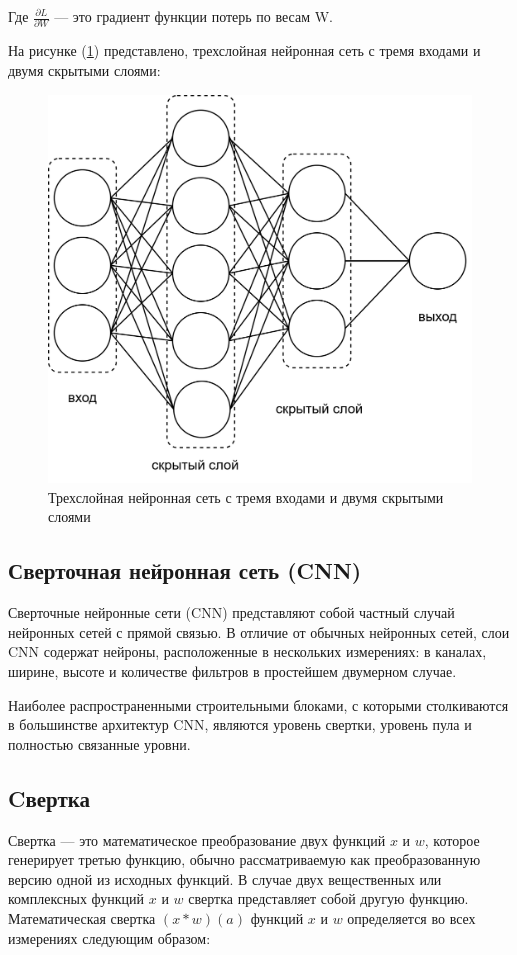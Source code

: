Где \(\frac{\partial L}{\partial W}\) — это градиент функции потерь по весам W.

На рисунке (\ref{fig:neuron-arch}) представлено, трехслойная нейронная сеть с тремя входами и двумя скрытыми слоями: 
\begin{figure}[H]
	\centering
	\includegraphics[width=0.7\linewidth]{assets/neural-arch.png}
	\caption{Трехслойная нейронная сеть с тремя входами и двумя скрытыми слоями}
	\label{fig:neuron-arch}
\end{figure}

\subsection{Сверточная нейронная сеть (CNN)}

Сверточные нейронные сети (CNN) представляют собой частный случай нейронных сетей с прямой связью. В отличие от обычных нейронных сетей, слои CNN содержат нейроны, расположенные в нескольких измерениях: в каналах, ширине, высоте и количестве фильтров в простейшем двумерном случае.

Наиболее распространенными строительными блоками, с которыми столкиваются в большинстве архитектур CNN, являются уровень свертки, уровень пула и полностью связанные уровни.

\subsection*{Cвертка}

Свертка — это математическое преобразование двух функций \(x\) и \(w\), которое генерирует третью функцию, обычно рассматриваемую как преобразованную версию одной из исходных функций. В случае двух вещественных или комплексных функций \(x\) и \(w\) свертка представляет собой другую функцию. Математическая свертка \((x * w)(a)\) функций \(x\) и \(w\) определяется во всех измерениях следующим образом:

